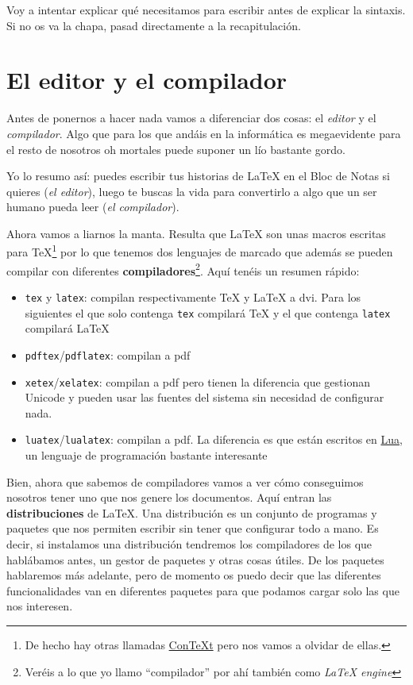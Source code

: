 Voy a intentar explicar qué necesitamos para escribir antes de explicar
la sintaxis. Si no os va la chapa, pasad directamente a la
recapitulación.

\section{El editor y el compilador}\label{el-editor-y-el-compilador}

Antes de ponernos a hacer nada vamos a diferenciar dos cosas: el
\emph{editor} y el \emph{compilador}. Algo que para los que andáis en la
informática es megaevidente para el resto de nosotros oh mortales puede
suponer un lío bastante gordo.

Yo lo resumo así: puedes escribir tus historias de LaTeX en el Bloc de
Notas si quieres (\emph{el editor}), luego te buscas la vida para
convertirlo a algo que un ser humano pueda leer (\emph{el compilador}).

Ahora vamos a liarnos la manta. Resulta que LaTeX son unas macros
escritas para TeX\footnote{De hecho hay otras llamadas
  \href{https://en.wikipedia.org/wiki/ConTeXt}{ConTeXt} pero nos vamos a
  olvidar de ellas.} por lo que tenemos dos lenguajes de marcado que
además se pueden compilar con diferentes \textbf{compiladores}\footnote{Veréis
  a lo que yo llamo ``compilador'' por ahí también como \emph{LaTeX
  engine}}. Aquí tenéis un resumen rápido:

\begin{itemize}
\item
  \texttt{tex} y \texttt{latex}: compilan respectivamente TeX y LaTeX a
  dvi. Para los siguientes el que solo contenga \texttt{tex} compilará
  TeX y el que contenga \texttt{latex} compilará LaTeX
\item
  \texttt{pdftex}/\texttt{pdflatex}: compilan a pdf
\item
  \texttt{xetex}/\texttt{xelatex}: compilan a pdf pero tienen la
  diferencia que gestionan Unicode y pueden usar las fuentes del sistema
  sin necesidad de configurar nada.
\item
  \texttt{luatex}/\texttt{lualatex}: compilan a pdf. La diferencia es
  que están escritos en \href{http://www.lua.org/}{Lua}, un lenguaje de
  programación bastante interesante
\end{itemize}

Bien, ahora que sabemos de compiladores vamos a ver cómo conseguimos
nosotros tener uno que nos genere los documentos. Aquí entran las
\textbf{distribuciones} de LaTeX. Una distribución es un conjunto de
programas y paquetes que nos permiten escribir sin tener que configurar
todo a mano. Es decir, si instalamos una distribución tendremos los
compiladores de los que hablábamos antes, un gestor de paquetes y otras
cosas útiles. De los paquetes hablaremos más adelante, pero de momento
os puedo decir que las diferentes funcionalidades van en diferentes
paquetes para que podamos cargar solo las que nos interesen.

